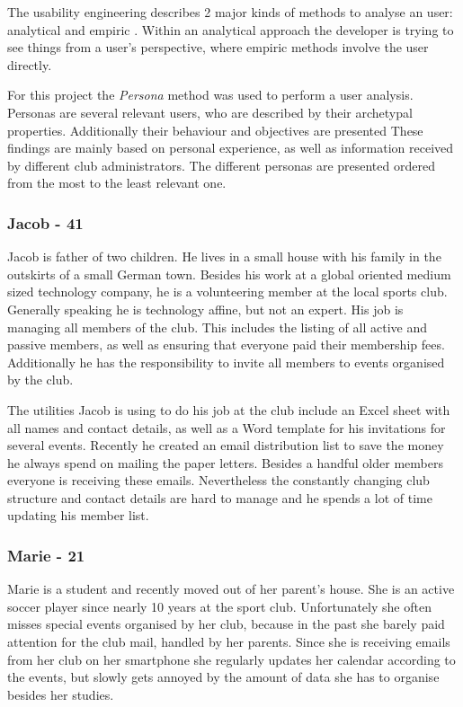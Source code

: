 The usability engineering describes 2 major kinds of methods to analyse an user: analytical and empiric \cite[p. 20]{Gulzow:2015aa}. Within an analytical approach the developer is trying to see things from a user's perspective, where empiric methods involve the user directly. 

For this project the \emph{Persona} method was used to perform a user analysis. Personas are several relevant users, who are described by their archetypal properties. Additionally their behaviour and objectives are presented \cite[p. 30]{Gulzow:2015aa} These findings are mainly based on personal experience, as well as information received by different club administrators. The different personas are presented ordered from the most to the least relevant one.

\subsubsection{Jacob - 41}
\label{sec:Jacob}

Jacob is father of two children. He lives in a small house with his family in the outskirts of a small German town. Besides his work at a global oriented medium sized technology company, he is a volunteering member at the local sports club. Generally speaking he is technology affine, but not an expert. His job is managing all members of the club. This includes the listing of all active and passive members, as well as ensuring that everyone paid their membership fees. Additionally he has the responsibility to invite all members to events organised by the club. 

The utilities Jacob is using to do his job at the club include an Excel sheet with all names and contact details, as well as a Word template for his invitations for several events. Recently he created an email distribution list to save the money he always spend on mailing the paper letters. Besides a handful older members everyone is receiving these emails. Nevertheless the constantly changing club structure and contact details are hard to manage and he spends a lot of time updating his member list.

\subsubsection{Marie - 21}
Marie is a student and recently moved out of her parent's house. She is an active soccer player since nearly 10 years at the sport club. Unfortunately she often misses special events organised by her club, because in the past she barely paid attention for the club mail, handled by her parents. Since she is receiving emails from her club on her smartphone she regularly updates her calendar according to the events, but slowly gets annoyed by the amount of data she has to organise besides her studies.

